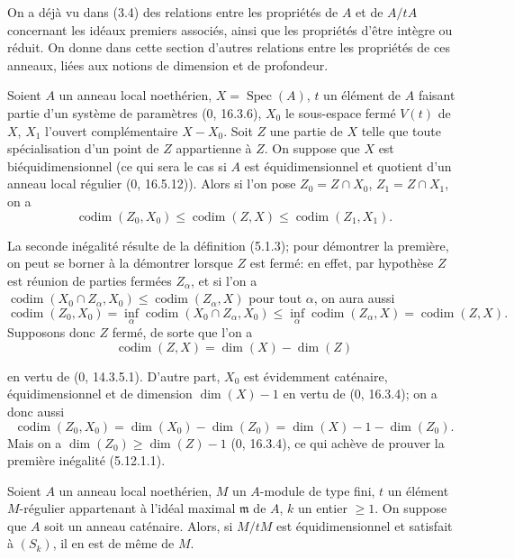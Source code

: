On a déjà vu dans (3.4) des relations entre les propriétés de $A$ et de $A/tA$
concernant les idéaux premiers associés, ainsi que les propriétés d'être
intègre ou réduit. On donne dans cette section d'autres relations entre les
propriétés de ces anneaux, liées aux notions de dimension et de profondeur.

\begin{proposition}[5.12.1]
\label{IV.2.s5.12.1-fr}
Soient $A$ un anneau local noethérien, $X=\operatorname{Spec}(A)$, $t$ un
élément de $A$ faisant partie d'un système de paramètres (0, 16.3.6), $X_0$ le
sous-espace fermé $V(t)$ de $X$, $X_1$ l'ouvert complémentaire $X-X_0$. Soit
$Z$ une partie de $X$ telle que toute spécialisation d'un point de $Z$
appartienne à $Z$. On suppose que $X$ est biéquidimensionnel (ce qui sera le
cas si $A$ est équidimensionnel et quotient d'un anneau local régulier (0,
16.5.12)). Alors si l'on pose $Z_0=Z\cap X_0$, $Z_1=Z\cap X_1$, on a
\begin{equation}
\operatorname{codim}(Z_0,X_0)\leq\operatorname{codim}(Z,X)
\leq\operatorname{codim}(Z_1,X_1).
\tag{5.12.1.1}\label{IV.2.s5.12.1.1-fr}
\end{equation}
\end{proposition}

La seconde inégalité résulte de la définition (5.1.3); pour démontrer la
première, on peut se borner à la démontrer lorsque $Z$ est fermé: en effet, par
hypothèse $Z$ est réunion de parties fermées $Z_\alpha$, et si l'on a
$\operatorname{codim}(X_0\cap Z_\alpha,X_0)
\leq\operatorname{codim}(Z_\alpha,X)$ pour tout $\alpha$, on aura aussi
\[
\operatorname{codim}(Z_0,X_0)
=\inf_\alpha\operatorname{codim}(X_0\cap Z_\alpha,X_0)
\leq\inf_\alpha\operatorname{codim}(Z_\alpha,X)
=\operatorname{codim}(Z,X).
\]
Supposons donc $Z$ fermé, de sorte que l'on a
\[
\operatorname{codim}(Z,X)=\dim(X)-\dim(Z)
\]


en vertu de (0, 14.3.5.1). D'autre part, $X_0$ est évidemment caténaire,
équidimensionnel et de dimension $\dim(X)-1$ en vertu de (0, 16.3.4); on a
donc aussi
\[
\operatorname{codim}(Z_0,X_0)=\dim(X_0)-\dim(Z_0)
=\dim(X)-1-\dim(Z_0).
\]
Mais on a $\dim(Z_0)\geq\dim(Z)-1$ (0, 16.3.4), ce qui achève de prouver la
première inégalité (5.12.1.1).

\begin{proposition}[5.12.2]
\label{IV.2.s5.12.2-fr}
Soient $A$ un anneau local noethérien, $M$ un $A$-module de type fini, $t$ un
élément $M$-régulier appartenant à l'idéal maximal $\mathfrak m$ de $A$, $k$
un entier $\geq1$. On suppose que $A$ soit un anneau caténaire. Alors, si
$M/tM$ est équidimensionnel et satisfait à $(S_k)$, il en est de même de $M$.
\end{proposition}

